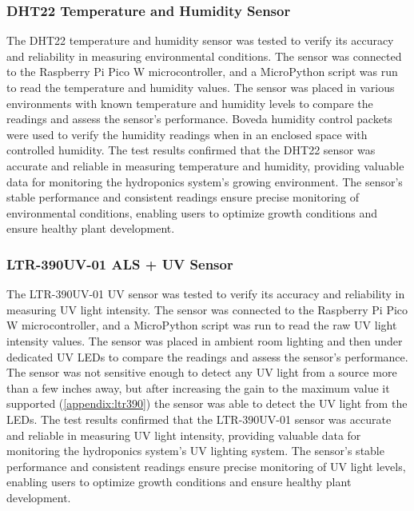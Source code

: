 \documentclass[12pt]{article} %
\begin{document}
\subsubsection{DHT22 Temperature and Humidity Sensor}
\noindent The DHT22 temperature and humidity sensor was tested to verify its accuracy and reliability in measuring environmental conditions. The sensor was connected to the Raspberry Pi Pico W microcontroller, and a MicroPython script was run to read the temperature and humidity values. The sensor was placed in various environments with known temperature and humidity levels to compare the readings and assess the sensor's performance. Boveda humidity control packets \cite{ref_boveda} were used to verify the humidity readings when in an enclosed space with controlled humidity. The test results confirmed that the DHT22 sensor was accurate and reliable in measuring temperature and humidity, providing valuable data for monitoring the hydroponics system's growing environment. The sensor's stable performance and consistent readings ensure precise monitoring of environmental conditions, enabling users to optimize growth conditions and ensure healthy plant development.
\subsubsection{LTR-390UV-01 ALS + UV Sensor}
\noindent The LTR-390UV-01 UV \cite{ref_ltr390} sensor was tested to verify its accuracy and reliability in measuring UV light intensity. The sensor was connected to the Raspberry Pi Pico W microcontroller, and a MicroPython script \cite{ref_uvforum} was run to read the raw UV light intensity values. The sensor was placed in ambient room lighting and then under dedicated UV LEDs to compare the readings and assess the sensor's performance. The sensor was not sensitive enough to detect any UV light from a source more than a few inches away, but after increasing the gain to the maximum value it supported (\ref{appendix:ltr390}) the sensor was able to detect the UV light from the LEDs. The test results confirmed that the LTR-390UV-01 sensor was accurate and reliable in measuring UV light intensity, providing valuable data for monitoring the hydroponics system's UV lighting system. The sensor's stable performance and consistent readings ensure precise monitoring of UV light levels, enabling users to optimize growth conditions and ensure healthy plant development.
\end{document}
